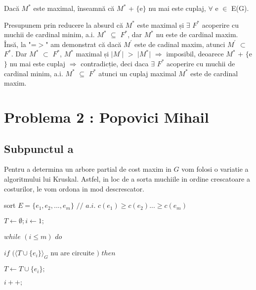 \documentclass{article}
\begin{document}
{{Dacă $M^*$ este maximal, înseamnă că $M^*$ + $\lbrace$e$\rbrace$ nu mai este cuplaj, $\forall$ e $\in$ E(G). 

Presupunem prin reducere la absurd că $M^*$ este maximal și $\exists$ $F^*$ acoperire cu muchii de cardinal minim, a.i.  $M^*$ $\subseteq$ $F^*$, dar $M^*$ nu este de cardinal maxim. Însă, la "=$>$" am demonstrat că dacă $M^{'}$ este de cadinal maxim, atunci $M^{'}$ $\subset$ $F^*$. Dar $M^*$ $\subset$ $F^*$, $M^*$ maximal și $\vert$$M^{'}$$\vert$ $>$ $\vert$$M^*$$\vert$ $\Rightarrow$ imposibil, deoarece $M^*$ + $\lbrace$e$\rbrace$ nu mai este cuplaj $\Rightarrow$ contradicție, deci daca $\exists$ $F^*$ acoperire cu muchii de cardinal minim, a.i.  $M^*$ $\subseteq$ $F^*$ atunci un cuplaj maximal $M^*$ este de cardinal maxim.

\section*{\fontsize{20}{50}\selectfont Problema 2 : Popovici Mihail}
\subsection*{\fontsize{16}{30}\selectfont Subpunctul a}
{\fontsize{14}{16}\selectfont 
    Pentru a determina un arbore partial de cost maxim in $G$ vom folosi o variatie a algoritmului lui Kruskal. Astfel, in loc de a sorta muchiile in ordine crescatoare a costurilor, le vom ordona in mod descrescator.
    \\ 
    \par sort $E=\lbrace e_1, e_2, ..., e_m \rbrace$ $//$ $a.i.$  $c(e_1)\geq c(e_2)...\geq c(e_m)$

    \par $T \leftarrow \emptyset; i \leftarrow 1;$
    \par $while$  $(i \leq m)$  $do$
    \par \hspace*{1cm} $if$ $(\langle T \cup \lbrace e_i \rbrace \rangle _G$ nu are circuite $)$  $then$
    \par \hspace*{1.5cm} $ T \leftarrow T \cup \lbrace e_i \rbrace ;$
    \par \hspace*{1cm} $i++;$
    }

}}
\end{document}
